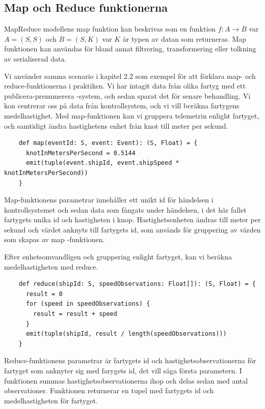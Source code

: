 \subsection{Map och Reduce funktionerna}

MapReduce modellens map funktion kan beskrivas som en funktion $f: A \rightarrow B$ var $A = (S, S)$ och $B = (S, K)$ var $K$ är typen av datan som returneras. Map funktionen kan användas för bland annat filtrering,
transformering eller tolkning av serialiserad data.

Vi använder samma scenario i kapitel 2.2 som exempel för att förklara map- och reduce-funktionerna i praktiken. Vi har intagit data från olika fartyg med ett
publicera-prenumerera -system, och sedan sparat det för senare behandling. Vi kon
centrerar oss på data från kontrollsystem, och vi vill beräkna fartygens
medelhastighet. Med map-funktionen kan vi gruppera telemetrin enlight fartyget,
och samtidigt ändra hastighetens enhet från knot till meter per sekund.

\begin{verbatim}
    def map(eventId: S, event: Event): (S, Float) = {
      knotInMetersPerSecond = 0.5144
      emit(tuple(event.shipId, event.shipSpeed * knotInMetersPerSecond))
    }
\end{verbatim}

Map-funktionens parametrar innehåller ett unikt id för händelsen i 
kontrollsystemet och sedan data som fångats under händelsen, i det här fallet
fartygets unika id och hastigheten i knop. Hastighetsenheten ändras till meter
per sekund och värdet anknyts till fartygets id, som används för gruppering av
värden som skapas av map -funktionen.

Efter enhetsomvandligen och gruppering enlight fartyget, kan vi beräkna 
medelhastigheten med reduce.

\begin{verbatim}
    def reduce(shipId: S, speedObservations: Float[]): (S, Float) = {
      result = 0
      for (speed in speedObservations) {
        result = result + speed
      }
      emit(tuple(shipId, result / length(speedObservations)))
    }
\end{verbatim}

Reduce-funktionens parametrar är fartygets id och hastighetsobservationerna 
för fartyget som anknyter sig med farygets id, det vill säga första parametern.
I funktionen summas hastighetsobservationerna ihop och delas sedan med antal
observationer. Funktionen returnerar en tupel med fartygets id och
medelhastigheten för fartyget.

